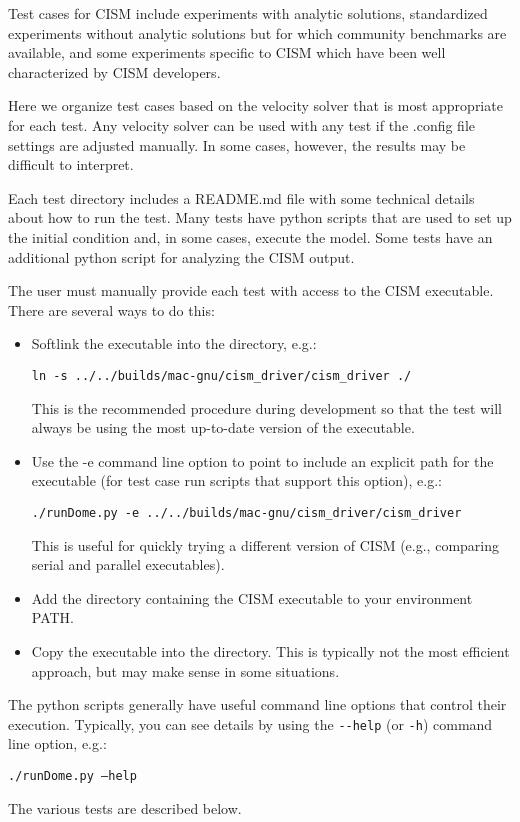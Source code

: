 
\label{ch:tests}

Test cases for CISM include experiments with analytic solutions, standardized experiments
without analytic solutions but for which community benchmarks are available, and
some experiments specific to CISM which have been well characterized by CISM developers.

Here we organize test cases based on the velocity solver that is most appropriate
for each test.  Any velocity solver can be used with any test
if the .config file settings are adjusted manually.  In some cases, however, the results
may be difficult to interpret.

Each test directory includes a README.md file with some technical details 
about how to run the test.  Many tests have python scripts that are used to set up
the initial condition and, in some cases, execute the model.  Some tests
have an additional python script for analyzing the CISM output.

The user must manually provide each test with access to the CISM executable.
There are several ways to do this:

\begin{itemize}
  \item Softlink the executable into the directory, e.g.:

        \texttt{ln -s ../../builds/mac-gnu/cism\_driver/cism\_driver ./}

        This is the recommended procedure during development so that the test
        will always be using the most up-to-date version of the executable.

  \item Use the -e command line option to point to include an explicit path for the executable (for test case run scripts that support this option), e.g.:

        \texttt{./runDome.py -e ../../builds/mac-gnu/cism\_driver/cism\_driver}

        This is useful for quickly trying a different version of CISM (e.g., comparing 
        serial and parallel executables).

  \item Add the directory containing the CISM executable to your environment PATH.

  \item Copy the executable into the directory.  This is typically not the most efficient approach,
        but may make sense in some situations.
\end{itemize}

The python scripts generally have useful
command line options that control their execution.  Typically, you can see details 
by using the \texttt{-{}-help} (or \texttt{-h}) command line option, e.g.:

\texttt{./runDome.py --help}

The various tests are described below.





